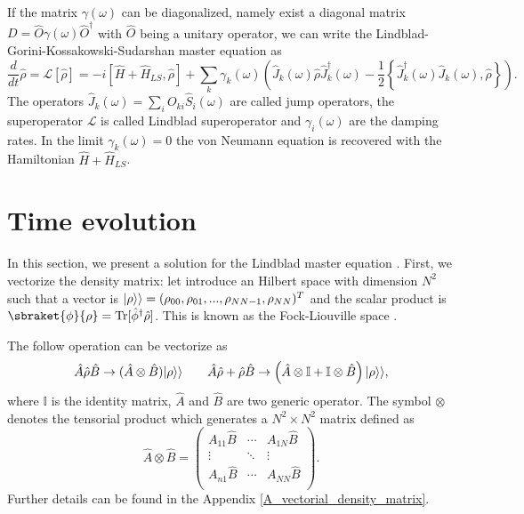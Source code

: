 If the matrix $\gamma(\omega)$ can be diagonalized, namely exist a diagonal matrix $D=\hat O \gamma(\omega) \hat O^\dagger$ with $\hat O$ being a unitary operator, we can write the Lindblad-Gorini-Kossakowski-Sudarshan master equation as
\begin{equation}\label{Lindbladian}
    \frac{d}{dt}\hat\rho =\mathcal{L}\left[\hat\rho\right] = -i\left[\hat H+\hat H_{LS},\hat\rho\right] + \sum_k \gamma_k(\omega) \left(\hat J_k(\omega) \hat\rho \hat J^\dagger_k(\omega) - \frac{1}{2}\left\{ \hat J^\dagger_k(\omega)\hat J_k(\omega), \hat\rho\right\} \right).
\end{equation}
The operators $\hat J_k(\omega)= \sum_i O_{ki} \hat S_{i}(\omega)$ are called jump operators, the superoperator $\mathcal{L}$ is called Lindblad superoperator and $\gamma_i(\omega)$ are the damping rates. In the limit $\gamma_k(\omega) = 0$ the von Neumann equation is recovered with the Hamiltonian $\hat H+\hat H_{LS}$.

\section{Time evolution}
In this section, we present a solution for the Lindblad master equation \cite{fujii2012}. 
First, we vectorize the density matrix: let introduce an Hilbert space with dimension $N^2$ such that a vector is $\lvert\rho\rangle\rangle = (\rho_{00},\rho_{01},...,\rho_{NN-1},\rho_{NN})^T$ and the scalar product is $\sbraket{\phi}{\rho}= \Tr[\hat\phi^\dagger\hat\rho]$. This is known as the Fock-Liouville space \cite{Manzano}.

The follow operation can be vectorize as
\begin{equation}
    \hat A \hat\rho \hat B \rightarrow (\hat A\otimes\hat B)\lvert\rho\rangle\rangle \qquad \hat A \hat\rho +\hat\rho\hat B \rightarrow \left(\hat A\otimes\mathbb{I} +\mathbb{I}\otimes\hat B\right)\lvert\rho\rangle\rangle,
\end{equation}
where $\mathbb{I}$ is the identity matrix, $\hat A$ and $\hat B$ are two generic operator. The symbol $\otimes$ denotes the tensorial product which generates a $N^2\times N^2$ matrix defined as
\begin{equation}
    \hat A\otimes\hat B = \begin{pmatrix}
        A_{11} \hat B & \cdots & A_{1N}\hat B\\
        \vdots & \ddots &\vdots\\
        A_{n1}\hat B& \cdots & A_{NN}\hat B\\
    \end{pmatrix}.
\end{equation}
Further details can be found in the Appendix \ref{A_vectorial_density_matrix}.

